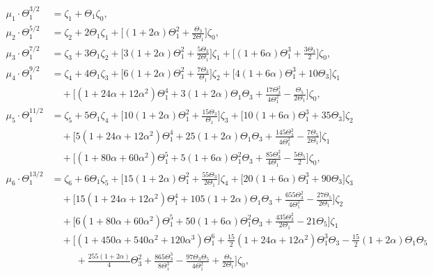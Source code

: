 \documentclass[11pt]{amsart}
\theoremstyle{definition}
\begin{document}
\begin{align*}
\mu_1\cdot\Theta_1^{3/2} &= \zeta_1 + \Theta_1\zeta_0,\\[1mm]
\mu_2\cdot\Theta_1^{5/2} &= \zeta_2 + 2\Theta_1\zeta_1 + \bigl[(1+2\alpha)\Theta_1^{2} + \tfrac{\Theta_3}{2\Theta_1}\bigr]\zeta_0,\\[1mm]
\mu_3\cdot\Theta_1^{7/2} &= \zeta_3 + 3\Theta_1\zeta_2 + \bigl[3(1+2\alpha)\Theta_1^{2}+\tfrac{5\Theta_3}{2\Theta_1}\bigr]\zeta_1
   + \bigl[(1+6\alpha)\Theta_1^{3}+\tfrac{3\Theta_3}{2}\bigr]\zeta_0,\\[1mm]
\mu_4\cdot\Theta_1^{9/2} &= \zeta_4 + 4\Theta_1\zeta_3
   + \bigl[6(1+2\alpha)\Theta_1^{2}+\tfrac{7\Theta_3}{\Theta_1}\bigr]\zeta_2
   + \bigl[4(1+6\alpha)\Theta_1^{3}+10\Theta_3\bigr]\zeta_1 \\
   &\quad + \bigl[(1+24\alpha+12\alpha^2)\Theta_1^{4}
          + 3(1+2\alpha)\Theta_1\Theta_3
          + \tfrac{17\Theta_3^{2}}{4\Theta_1^{2}}
          - \tfrac{\Theta_5}{2\Theta_1}\bigr]\zeta_0,\\[1mm]
\mu_5\cdot\Theta_1^{11/2} &= \zeta_5 + 5\Theta_1\zeta_4
   + \bigl[10(1+2\alpha)\Theta_1^{2}+\tfrac{15\Theta_3}{\Theta_1}\bigr]\zeta_3
   + \bigl[10(1+6\alpha)\Theta_1^{3}+35\Theta_3\bigr]\zeta_2\\
   &\quad + \bigl[5(1+24\alpha+12\alpha^2)\Theta_1^{4}
           + 25(1+2\alpha)\Theta_1\Theta_3
           + \tfrac{145\Theta_3^{2}}{4\Theta_1^{2}}
           - \tfrac{7\Theta_5}{2\Theta_1}\bigr]\zeta_1\\
   &\quad + \bigl[(1+80\alpha+60\alpha^2)\Theta_1^{5}
           + 5(1+6\alpha)\Theta_1^{2}\Theta_3
           + \tfrac{85\Theta_3^{2}}{4\Theta_1}
           - \tfrac{5\Theta_5}{2}\bigr]\zeta_0,\\[1mm]
\mu_6\cdot\Theta_1^{13/2} &= \zeta_6 + 6\Theta_1\zeta_5
   + \bigl[15(1+2\alpha)\Theta_1^{2}+\tfrac{55\Theta_3}{2\Theta_1}\bigr]\zeta_4
   + \bigl[20(1+6\alpha)\Theta_1^{3}+90\Theta_3\bigr]\zeta_3\\
   &\quad + \bigl[15(1+24\alpha+12\alpha^2)\Theta_1^{4}
           + 105(1+2\alpha)\Theta_1\Theta_3
           + \tfrac{655\Theta_3^{2}}{4\Theta_1^{2}}
           - \tfrac{27\Theta_5}{2\Theta_1}\bigr]\zeta_2\\
   &\quad + \bigl[6(1+80\alpha+60\alpha^2)\Theta_1^{5}
           + 50(1+6\alpha)\Theta_1^{2}\Theta_3
           + \tfrac{435\Theta_3^{2}}{2\Theta_1}
           - 21\Theta_5\bigr]\zeta_1\\
   &\quad + \bigl[(1+450\alpha+540\alpha^2+120\alpha^3)\Theta_1^{6}
           + \tfrac{15}{2}(1+24\alpha+12\alpha^2)\Theta_1^{3}\Theta_3
           - \tfrac{15}{2}(1+2\alpha)\Theta_1\Theta_5\\
   &\quad\phantom{{}+\bigl[}
           + \tfrac{255(1+2\alpha)}{4}\Theta_3^{2}
           + \tfrac{865\Theta_3^{3}}{8\Theta_1^{3}}
           - \tfrac{97\Theta_3\Theta_5}{4\Theta_1^{2}}
           + \tfrac{\Theta_7}{2\Theta_1}\bigr]\zeta_0,
\end{align*}
\end{document}

